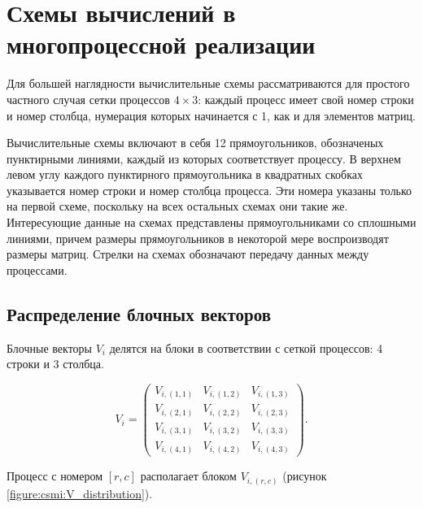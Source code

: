 \section{Схемы вычислений в многопроцессной реализации} \label{section:computational_scheme_in_multiprocess_implementation}

Для большей наглядности вычислительные схемы рассматриваются для простого частного случая сетки процессов $4 \times 3$: каждый процесс имеет свой номер строки и номер столбца,
нумерация которых начинается с 1, как и для элементов матриц.

Вычислительные схемы включают в себя 12 прямоугольников, обозначеных пунктирными линиями, каждый из которых соответствует процессу. В верхнем левом углу каждого
пунктирного прямоугольника в квадратных скобках указывается номер строки и номер столбца процесса. Эти номера указаны только на первой схеме, поскольку на всех остальных
схемах они такие же. Интересующие данные на схемах представлены прямоугольниками со сплошными линиями, причем размеры прямоугольников в некоторой мере воспроизводят размеры
матриц. Стрелки на схемах обозначают передачу данных между процессами. 

\subsection{Распределение блочных векторов}

Блочные векторы $V_i$ делятся на блоки в соответствии с сеткой процессов: 4 строки и 3 столбца.

$$
	V_i
	=
	\begin{pmatrix}
		V_{i,(1,1)} & V_{i,(1,2)} & V_{i,(1,3)} \\
		V_{i,(2,1)} & V_{i,(2,2)} & V_{i,(2,3)} \\
		V_{i,(3,1)} & V_{i,(3,2)} & V_{i,(3,3)} \\
		V_{i,(4,1)} & V_{i,(4,2)} & V_{i,(4,3)}
	\end{pmatrix}
	.
$$

Процесс с номером $[r,c]$ располагает блоком $V_{i,(r,c)}$ (рисунок \ref{figure:csmi:V_distribution}).

